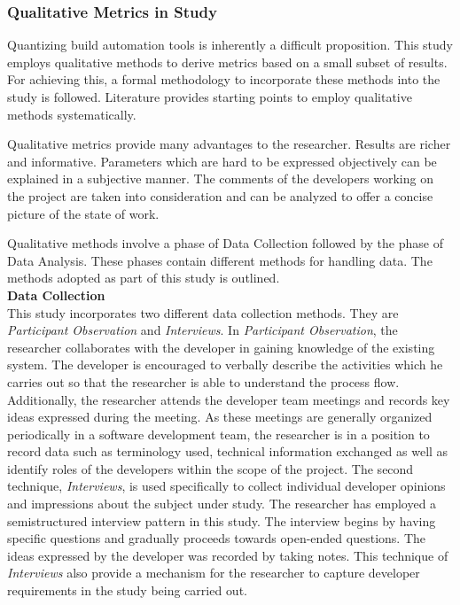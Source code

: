 \documentclass[12pt, a4paper, titlepage]{scrartcl}
\begin{document}
\subsubsection{Qualitative Metrics in Study}
Quantizing build automation tools is inherently a difficult proposition. This study employs qualitative methods to derive metrics based on a small subset of results. For achieving this, a formal methodology to incorporate these methods into the study is followed. Literature provides starting points to employ qualitative methods systematically\cite{seaman2009using}.  
\par Qualitative metrics provide many advantages to the researcher. Results are richer and informative. Parameters which are hard to be expressed objectively can be explained in a subjective manner. The comments of the developers working on the project are taken into consideration and can be analyzed to offer a concise picture of the state of work.  
\par Qualitative methods involve a phase of Data Collection followed by the phase of Data Analysis. These phases contain different methods for handling data. The methods adopted as part of this study is outlined.\\ 
\textbf{Data Collection} \\
This study incorporates two different data collection methods. They are \textit{Participant Observation}\cite{taylor1984introduction} and \textit{Interviews}. In \textit{Participant Observation}, the researcher collaborates with the developer in gaining knowledge of the existing system. The developer is encouraged to verbally describe the activities which he carries out so that the researcher is able to understand the process flow. Additionally, the researcher attends the developer team meetings and records key ideas expressed during the meeting. As these meetings are generally organized periodically in a software development team, the researcher is in a position to record data such as terminology used, technical information exchanged as well as identify roles of the developers within the scope of the project. The second technique, \textit{Interviews}\cite{seaman2009using}, is used specifically to collect individual developer opinions and impressions about the subject under study. The researcher has employed a semistructured interview pattern in this study. The interview begins by having specific questions and gradually proceeds towards open-ended questions. The ideas expressed by the developer was recorded by taking notes. This technique of \textit{Interviews} also provide a mechanism for the researcher to capture developer requirements in the study being carried out. \\
\end{document}
